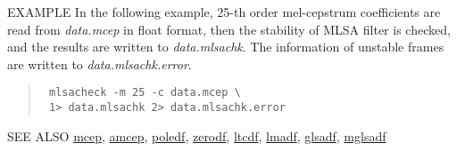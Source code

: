 \begin{qsection}{EXAMPLE}
In the following example,
25-th order mel-cepstrum coefficients are
read from {\em data.mcep} in float format,
then the stability of MLSA filter is checked,
 and the results are written to {\em data.mlsachk}.
The information of unstable frames are written to {\em data.mlsachk.error}.
\begin{quote}
 \verb! mlsacheck -m 25 -c data.mcep \! \\
 \verb! 1> data.mlsachk 2> data.mlsachk.error !
\end{quote}
\end{qsection}

\begin{qsection}{SEE ALSO}
\hyperlink{mcep}{mcep},
\hyperlink{amcep}{amcep},
\hyperlink{poledf}{poledf},
\hyperlink{zerodf}{zerodf},
\hyperlink{ltcdf}{ltcdf},
\hyperlink{lmadf}{lmadf},
\hyperlink{glsadf}{glsadf},
\hyperlink{mglsadf}{mglsadf}
\end{qsection}
